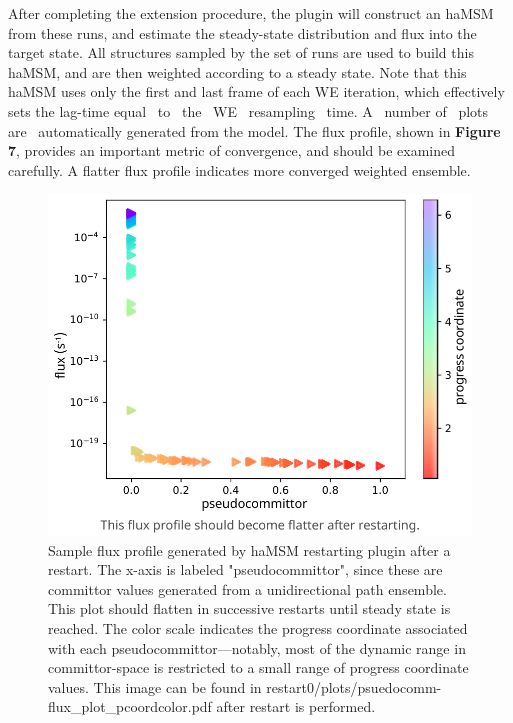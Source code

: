 After completing the extension procedure, the plugin will construct an haMSM from these runs, and estimate the steady-state distribution and flux into the target state. 
All structures sampled by the set of runs are used to build this haMSM, and are then weighted according to a steady state. 
Note that this haMSM uses only the first and last frame of each WE iteration, which effectively sets the lag-time equal~ to~ the~ WE~ resampling~ time. A~ number of~ plots~ are~ automatically generated from the model. 
The flux profile, shown in \textbf{Figure 7}, provides an important metric of convergence, and should be examined carefully. 
A flatter flux profile indicates more converged weighted ensemble.

\begin{figure}[ht]
    \centering
    \includegraphics[width=\columnwidth]{figures/Figure7_committor.pdf}
    \caption{Sample flux profile generated by haMSM restarting plugin after a restart. 
    The x-axis is labeled "pseudocommittor", since these are committor values generated from a unidirectional path ensemble. 
    This plot should flatten in successive restarts until steady state is reached.
    The color scale indicates the progress coordinate associated with each pseudocommittor---notably, most of the dynamic range in committor-space is restricted to a small range of progress coordinate values. 
    This image can be found in restart0/plots/psuedocomm-flux\_plot\_pcoordcolor.pdf after restart is performed.}
\end{figure}

